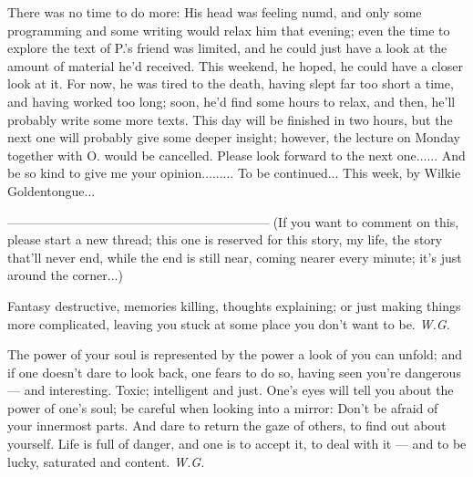 There was no time to do more: His head was feeling numd, and only some programming and some writing would relax him that evening; even the time to explore the text of P.'s friend was limited, and he could just have a look at the amount of material he'd received. This weekend, he hoped, he could have a closer look at it. 
For now, he was tired to the death, having slept far too short a time, and having worked too long; soon, he'd find some hours to relax, and then, he'll probably write some more texts. 
This day will be finished in two hours, but the next one will probably give some deeper insight; however, the lecture on Monday together with O. would be cancelled. 
Please look forward to the next one......
And be so kind to give me your opinion.........
To be continued...
This week, by Wilkie Goldentongue...

--------------------------------------------------------------
(If you want to comment on this, please start a new thread; this one is reserved for this story, my life, the story that'll never end, while the end is still near, coming nearer every minute; it's just around the corner...)

Fantasy destructive, 
memories killing, 
thoughts explaining; 
or just making things 
more complicated, 
leaving you stuck 
at some place 
you don't want to be. 
\emph{W.G.}

The power of your soul 
is represented by the power 
a look of you can unfold; 
and if one doesn't dare to look back, 
one fears to do so, 
having seen you're dangerous --- 
and interesting. 
Toxic; 
intelligent and just. 
One's eyes will tell you 
about the power 
of one's soul; 
be careful 
when looking into a mirror: 
Don't be afraid of your innermost parts. 
And dare to return the gaze of others, 
to find out about yourself. 
Life is full of danger, 
and one is to accept it, 
to deal with it --- 
and to be lucky, 
saturated and content. 
\emph{W.G.}
